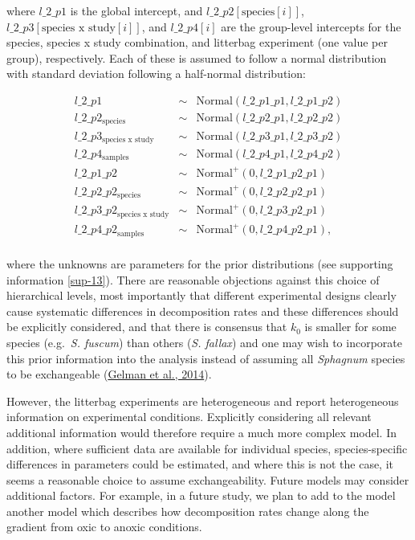 \documentclass[
  12pt,
]{article}
\begin{document}
where \(l\_2\_p1\) is the global intercept, and \(l\_2\_p2[\text{species}[i]]\), \(l\_2\_p3[\text{species x study}[i]]\), and \(l\_2\_p4[i]\) are the group-level intercepts for the species, species x study combination, and litterbag experiment (one value per group), respectively. Each of these is assumed to follow a normal distribution with standard deviation following a half-normal distribution:

\begin{equation}
\begin{aligned}
l\_2\_p1 & \sim & \text{Normal}(l\_2\_p1\_p1, l\_2\_p1\_p2)\\
l\_2\_p2_{\text{species}} & \sim & \text{Normal}(l\_2\_p2\_p1, l\_2\_p2\_p2)\\
l\_2\_p3_{\text{species x study}} & \sim & \text{Normal}(l\_2\_p3\_p1, l\_2\_p3\_p2)\\
l\_2\_p4_{\text{samples}} & \sim & \text{Normal}(l\_2\_p4\_p1, l\_2\_p4\_p2)\\
l\_2\_p1\_p2 & \sim & \text{Normal}^+(0, l\_2\_p1\_p2\_p1)\\
l\_2\_p2\_p2_{\text{species}} & \sim & \text{Normal}^+(0, l\_2\_p2\_p2\_p1)\\
l\_2\_p3\_p2_{\text{species x study}} & \sim & \text{Normal}^+(0, l\_2\_p3\_p2\_p1)\\
l\_2\_p4\_p2_{\text{samples}} & \sim & \text{Normal}^+(0, l\_2\_p4\_p2\_p1),\\
\label{eq:leaching-hierarchical-model-l0-2}
\end{aligned}
\end{equation}

where the unknowns are parameters for the prior distributions (see supporting information \ref{sup-13}). There are reasonable objections against this choice of hierarchical levels, most importantly that different experimental designs clearly cause systematic differences in decomposition rates and these differences should be explicitly considered, and that there is consensus that \(k_0\) is smaller for some species (e.g.~\emph{S. fuscum}) than others (\emph{S. fallax}) and one may wish to incorporate this prior information into the analysis instead of assuming all \emph{Sphagnum} species to be exchangeable (\protect\hyperlink{ref-Gelman.2014}{Gelman et al., 2014}).

However, the litterbag experiments are heterogeneous and report heterogeneous information on experimental conditions. Explicitly considering all relevant additional information would therefore require a much more complex model. In addition, where sufficient data are available for individual species, species-specific differences in parameters could be estimated, and where this is not the case, it seems a reasonable choice to assume exchangeability. Future models may consider additional factors. For example, in a future study, we plan to add to the model another model which describes how decomposition rates change along the gradient from oxic to anoxic conditions.
\end{document}

